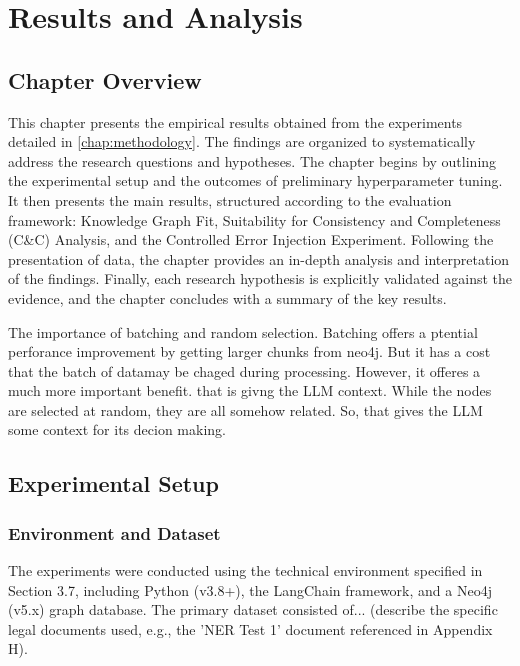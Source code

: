 \chapter{Results and Analysis}
\label{chap:results}

\section{Chapter Overview}
\label{sec:results_overview}
This chapter presents the empirical results obtained from the experiments detailed in \cref{chap:methodology}. The findings are organized to systematically address the research questions and hypotheses. The chapter begins by outlining the experimental setup and the outcomes of preliminary hyperparameter tuning. It then presents the main results, structured according to the evaluation framework: Knowledge Graph Fit, Suitability for Consistency and Completeness (C\&C) Analysis, and the Controlled Error Injection Experiment. Following the presentation of data, the chapter provides an in-depth analysis and interpretation of the findings. Finally, each research hypothesis is explicitly validated against the evidence, and the chapter concludes with a summary of the key results.

The importance of batching and random selection. Batching offers a ptential perforance improvement by getting larger chunks from neo4j. But it has a cost that the batch of datamay be chaged during processing. However, it offeres a much more important benefit. that is givng the LLM context. While the nodes are selected at random, they are all somehow related. So, that gives the LLM some context for its decion making.

\section{Experimental Setup}
\label{sec:exp_setup}
\subsection{Environment and Dataset}
The experiments were conducted using the technical environment specified in Section 3.7, including Python (v3.8+), the LangChain framework, and a Neo4j (v5.x) graph database. The primary dataset consisted of... (describe the specific legal documents used, e.g., the 'NER Test 1' document referenced in Appendix H).

